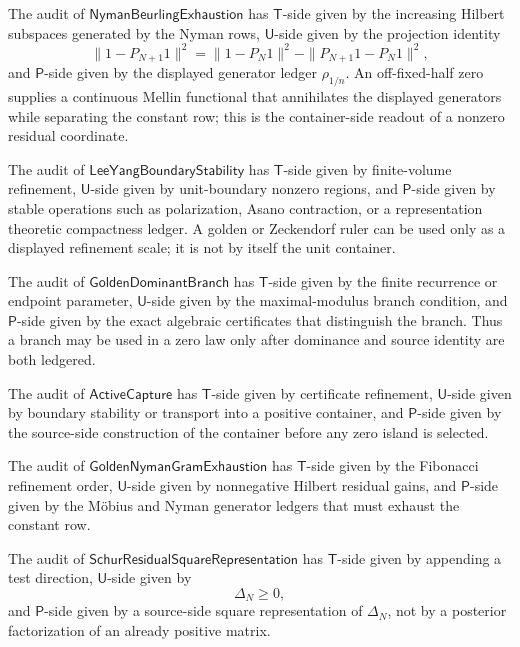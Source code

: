 \begin{principle}
\label{prin:rh-nyman-audit-row}
The audit of $\mathsf{NymanBeurlingExhaustion}$ has $\mathsf T$-side
given by the increasing Hilbert subspaces generated by the Nyman rows,
$\mathsf U$-side given by the projection identity
$$
\|1-P_{N+1}1\|^2
=
\|1-P_N1\|^2-\|P_{N+1}1-P_N1\|^2,
$$
and $\mathsf P$-side given by the displayed generator ledger
$\rho_{1/n}$.  An off-fixed-half zero supplies a continuous Mellin
functional that annihilates the displayed generators while separating
the constant row; this is the container-side readout of a nonzero
residual coordinate.
\end{principle}

\begin{principle}
\label{prin:rh-boundary-dominance-audit-rows}
The audit of $\mathsf{LeeYangBoundaryStability}$ has $\mathsf T$-side
given by finite-volume refinement, $\mathsf U$-side given by
unit-boundary nonzero regions, and $\mathsf P$-side given by stable
operations such as polarization, Asano contraction, or a representation
theoretic compactness ledger.  A golden or Zeckendorf ruler can be used
only as a displayed refinement scale; it is not by itself the unit
container.

The audit of $\mathsf{GoldenDominantBranch}$ has $\mathsf T$-side given
by the finite recurrence or endpoint parameter, $\mathsf U$-side given
by the maximal-modulus branch condition, and $\mathsf P$-side given by
the exact algebraic certificates that distinguish the branch.  Thus a
branch may be used in a zero law only after dominance and source
identity are both ledgered.
\end{principle}

\begin{principle}
\label{prin:rh-capture-nyman-schur-audit-rows}
The audit of $\mathsf{ActiveCapture}$ has $\mathsf T$-side given by
certificate refinement, $\mathsf U$-side given by boundary stability or
transport into a positive container, and $\mathsf P$-side given by the
source-side construction of the container before any zero island is
selected.

The audit of $\mathsf{GoldenNymanGramExhaustion}$ has $\mathsf T$-side
given by the Fibonacci refinement order, $\mathsf U$-side given by
nonnegative Hilbert residual gains, and $\mathsf P$-side given by the
Möbius and Nyman generator ledgers that must exhaust the constant row.

The audit of $\mathsf{SchurResidualSquareRepresentation}$ has
$\mathsf T$-side given by appending a test direction, $\mathsf U$-side
given by
$$
\Delta_N\ge0,
$$
and $\mathsf P$-side given by a source-side square representation of
$\Delta_N$, not by a posterior factorization of an already positive
matrix.
\end{principle}

